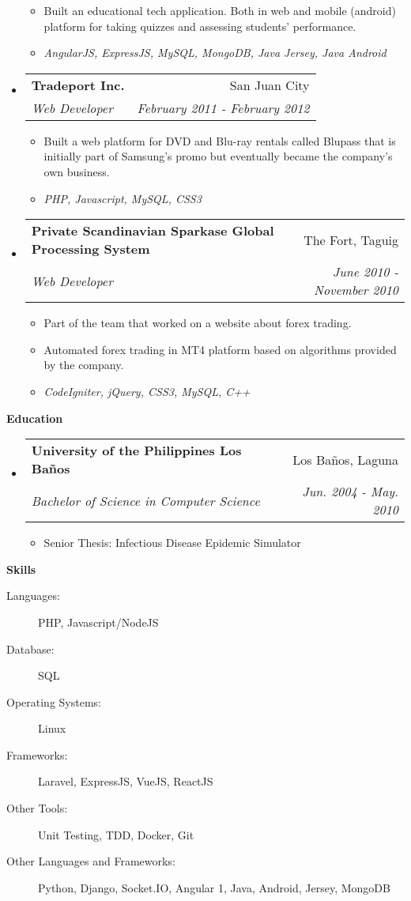 \documentclass[letterpaper,9pt]{article}
\makeatletter
\newcommand{\resitem}[1]{\item #1 \vspace{-2pt}}
\newcommand{\resheading}[1]{{\large \colorbox{mygrey}{\begin{minipage}{\textwidth}{\textbf{#1 \vphantom{p\^{E}}}}\end{minipage}}}}
\newcommand{\ressubheading}[4]{
\begin{tabular*}{7.0in}{l@{\extracolsep{\fill}}r}
		\textbf{#1} & #2 \\
		\textit{#3} & \textit{#4} \\
\end{tabular*}\vspace{-6pt}}
\makeatother
\begin{document}
\begin{itemize}
	\begin{itemize}
		\resitem{Built an educational tech application. Both in web and mobile (android) platform for taking quizzes and assessing students’ performance.}
        \resitem{\textit{AngularJS, ExpressJS, MySQL, MongoDB, Java Jersey, Java Android}}
	\end{itemize}
\item
	\ressubheading{Tradeport Inc.}{San Juan City}{Web Developer}{February 2011 - February 2012}
	\begin{itemize}
		\resitem{Built a web platform for DVD and Blu-ray rentals called Blupass that is initially part of Samsung’s promo but eventually became the company’s own business.}
        \resitem{\textit{PHP, Javascript, MySQL, CSS3}}
	\end{itemize}
\item
	\ressubheading{Private Scandinavian Sparkase Global Processing System}{The Fort, Taguig}{Web Developer}{June 2010 - November 2010}
	\begin{itemize}
		\resitem{Part of the team that worked on a website about forex trading.}
		\resitem{Automated forex trading in MT4 platform based on algorithms provided by the company.}
        \resitem{\textit{CodeIgniter, jQuery, CSS3, MySQL, C++}}
	\end{itemize}
\end{itemize}

\resheading{Education}
\begin{itemize}
\item
	\ressubheading{University of the Philippines Los Ba\~nos}{Los Ba\~nos, Laguna}{Bachelor of Science in Computer Science}{Jun. 2004 - May. 2010}
	\begin{itemize}
		\resitem{Senior Thesis: Infectious Disease Epidemic Simulator}
	\end{itemize}

\end{itemize}

\resheading{Skills}

\begin{description}
\item[Languages:]
PHP, Javascript/NodeJS
\item[Database:]
SQL
\item[Operating Systems:]
Linux 
\item[Frameworks:]
Laravel, ExpressJS, VueJS, ReactJS
\item[Other Tools:]
Unit Testing, TDD, Docker, Git
\item[Other Languages and Frameworks:]
Python, Django, Socket.IO, Angular 1, Java, Android, Jersey, MongoDB
\end{description}

\pagebreak
\end{document}
